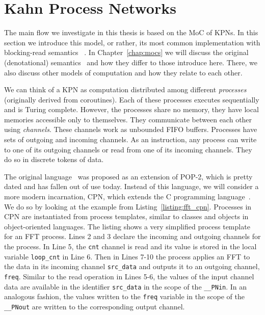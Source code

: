 \section{Kahn Process Networks}
\label{sec:kpn_basic}

The main flow we investigate in this thesis is based on the \ac{MoC} of \acfp{KPN}.
In this section we introduce this model, or rather, its most common implementation with blocking-read semantics~\cite{kahn_macqueen} .
In Chapter~\ref{chap:mocs} we will discuss the original (denotational) semantics~\cite{kahn74} and how they differ to those introduce here.
There, we also discuss other models of computation and how they relate to each other.

We can think of a \ac{KPN} as computation distributed among different \emph{processes} (originally derived from coroutines).
Each of these processes executes sequentially and is Turing complete. However, the processes share no memory, they have local memories accessible only to themselves.
They communicate between each other using \emph{channels}. These channels work as unbounded \acs{FIFO} buffers. 
Processes have sets of outgoing and incoming channels.
As an instruction, any process can write to one of its outgoing channels or read from one of its incoming channels.
They do so in discrete tokens of data.

The original language~\cite{kahn_macqueen} was proposed as an extension of POP-2, which is pretty dated and has fallen out of use today.
Instead of this language, we will consider a more modern incarnation, \ac{CPN}, which extends the C programming language~\cite{cpn}.
We do so by looking at the example from Listing~\ref{listing:fft_cpn}. 
Processes in \ac{CPN} are instantiated from process templates, similar to classes and objects in object-oriented languages.
The listing shows a very simplified process template for an \acs{FFT} process. 
Lines 2 and 3 declare the incoming and outgoing channels for the process.
In Line 5, the \texttt{cnt} channel is read and its value is stored in the local variable \texttt{loop\_cnt} in Line 6.
Then in Lines 7-10 the process applies an \acs{FFT} to the data in its incoming channel \texttt{src\_data} and outputs it to an outgoing channel, \texttt{freq}. 
Similar to the read operation in Lines 5-6, the values of the input channel data are available in the identifier \texttt{src\_data} in the scope of the \texttt{\_\_PNin}.
In an analogous fashion, the values written to the \texttt{freq} variable in the scope of the \texttt{\_\_PNout} are written to the corresponding output channel.

